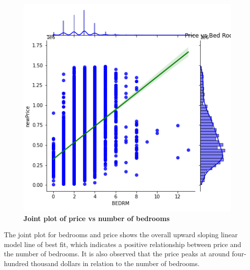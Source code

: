 \documentclass[12pt]{report}
\begin{document}
\begin{figure}[h]
\begin{center}
\includegraphics[width=130mm]{BedJoint.png}
\end{center}
\caption{\textbf{Joint plot of price vs number of bedrooms}}
\label{fig:bedJoint}
\end{figure}
The joint plot for bedrooms and price shows the overall upward sloping linear model line of best fit, which indicates a positive relationship between price and the number of bedrooms. It is also observed that the price peaks at around four-hundred thousand dollars in relation to the number of bedrooms. 
\clearpage
\end{document}
